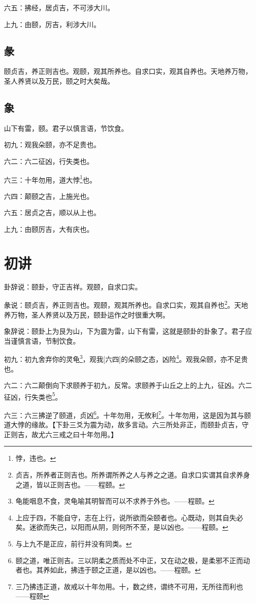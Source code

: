 \documentclass[12pt,oneside]{book}
\begin{document}
六五：拂经，居贞吉，不可涉大川。

上九：由颐，厉吉，利涉大川。

\subsection{彖}
颐贞吉，养正则吉也。观颐，观其所养也。自求口实，观其自养也。天地养万物，圣人养贤以及万民，颐之时大矣哉。

\subsection{象}
山下有雷，颐。君子以慎言语，节饮食。

初九：观我朵颐，亦不足贵也。

六二：六二征凶，行失类也。

六三：十年勿用，道大悖\footnote{悖，违也。}也。

六四：颠颐之吉，上施光也。

六五：居贞之吉，顺以从上也。

上九：由颐厉吉，大有庆也。

\section{初讲}
卦辞说：颐卦，守正吉祥。观颐，自求口实。

彖说：颐贞吉，养正则吉也。观颐，观其所养也。自求口实，观其自养也\footnote{贞吉，所养者正则吉也。所养谓所养之人与养之之道。自求口实谓其自求养身之道，皆以正则吉也。——程颐。}。天地养万物，圣人养贤以及万民，颐卦运作之时很重大啊。

象辞说：颐卦上为艮为山，下为震为雷，山下有雷，这就是颐卦的卦象了。君子应当谨慎言语，节制饮食。

初九：初九舍弃你的灵龟\footnote{龟能咽息不食，灵龟喻其明智而可以不求养于外也。——程颐。}，观我[六四]的朵颐之态，凶险\footnote{上应于四，不能自守，志在上行，说所欲而朵颐者也。心既动，则其自失必矣。迷欲而失己，以阳而从阴，则何所不至，是以凶也。——程颐。}。观我朵颐，亦不足贵也。

六二：六二颠倒向下求颐养于初九，反常。求颐养于山丘之上的上九，征凶。六二征凶，行失类也\footnote{与上九不是正应，前行并没有同类。}。

六三：六三拂逆了颐道，贞凶\footnote{颐之道，唯正则吉。三以阴柔之质而处不中正，又在动之极，是柔邪不正而动者也。其养如此，拂违于颐之正道，是以凶也。——程颐。}。十年勿用，无攸利\footnote{三乃拂违正道，故戒以十年勿用。十，数之终，谓终不可用，无所往而利也——程颐}。十年勿用，这是因为其与颐道大悖的缘故。【下卦三爻为震为动，故多言动。六三所处非正，而颐卦贞吉，守正则吉，故尤六三戒之曰十年勿用。】
\end{document}
